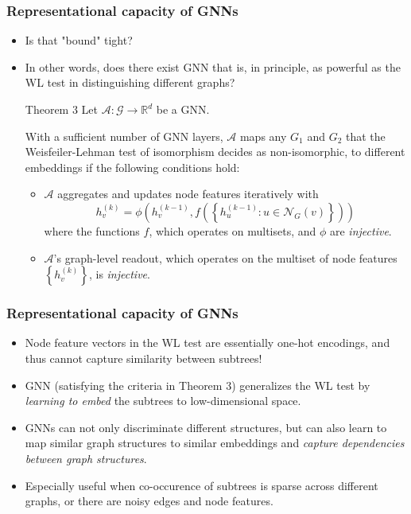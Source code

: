 \documentclass{beamer}
\begin{document}
\begin{frame}
\frametitle{Representational capacity of GNNs}

\begin{itemize}
	\item Is that "bound" tight? \pause
	
	\item In other words, does there exist GNN that is, in principle, as powerful as the WL test in distinguishing different graphs? \pause

\begin{block}{Theorem 3}
Let $\mathcal{A} : \mathcal{G} \rightarrow \mathbb{R}^d$ be a GNN.

With a sufficient number of GNN layers, $\mathcal{A}$ maps any $G_1$ and $G_2$ that the Weisfeiler-Lehman test of isomorphism decides as non-isomorphic, to different embeddings if the following conditions hold:

\begin{itemize}
\item $\mathcal{A}$ aggregates and updates node features iteratively with
$$h_v^{(k)} = \phi \left( h_v^{(k - 1)}, f \left( \left\{ h_u^{(k - 1)} : u \in \mathcal{N}_G(v) \right\} \right) \right)$$
where the functions $f$, which operates on multisets, and $\phi$ are {\it injective}.
\item $\mathcal{A}$'s graph-level readout, which operates on the multiset of node features $\left\{ h_v^{(k)} \right\}$, is {\it injective}.
\end{itemize}
\end{block}
\end{itemize}

\end{frame}

\begin{frame}
\frametitle{Representational capacity of GNNs}

\begin{itemize}
	\item Node feature vectors in the WL test are essentially one-hot encodings, and thus cannot capture similarity between subtrees! \pause
	
	\item GNN (satisfying the criteria in Theorem 3) generalizes the WL test by {\it learning to embed} the subtrees to low-dimensional space. \pause
	
	\item GNNs can not only discriminate different structures, but can also \alert{learn to map similar graph structures to similar embeddings and {\it capture dependencies between graph structures}}. \pause
	
	\item Especially useful when co-occurence of subtrees is sparse across different graphs, or there are noisy edges and node features.
\end{itemize}

\end{frame}
\end{document}
